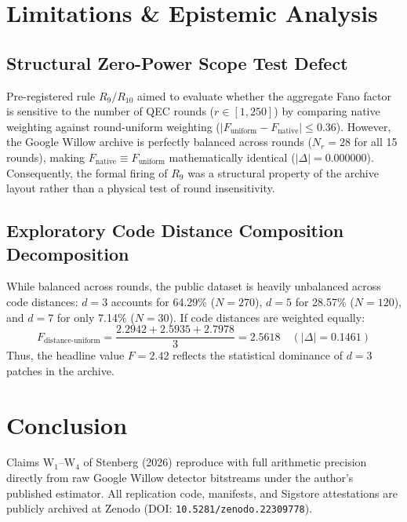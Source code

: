 \documentclass[10pt,a4paper,onecolumn]{article}
\begin{document}
\section{Limitations \& Epistemic Analysis}

\subsection{Structural Zero-Power Scope Test Defect}
Pre-registered rule $R_9/R_{10}$ aimed to evaluate whether the aggregate Fano factor is sensitive to the number of QEC rounds ($r \in [1, 250]$) by comparing native weighting against round-uniform weighting ($|F_{\text{uniform}} - F_{\text{native}}| \le 0.36$). However, the Google Willow archive is perfectly balanced across rounds ($N_r = 28$ for all 15 rounds), making $F_{\text{native}} \equiv F_{\text{uniform}}$ mathematically identical ($|\Delta| = 0.000000$). Consequently, the formal firing of $R_9$ was a structural property of the archive layout rather than a physical test of round insensitivity.

\subsection{Exploratory Code Distance Composition Decomposition}
While balanced across rounds, the public dataset is heavily unbalanced across code distances: $d=3$ accounts for 64.29\% ($N=270$), $d=5$ for 28.57\% ($N=120$), and $d=7$ for only 7.14\% ($N=30$). If code distances are weighted equally:
\begin{equation}
F_{\text{distance-uniform}} = \frac{2.2942 + 2.5935 + 2.7978}{3} = \mathbf{2.5618} \quad (|\Delta| = 0.1461)
\end{equation}
Thus, the headline value $F=2.42$ reflects the statistical dominance of $d=3$ patches in the archive.

\section{Conclusion}
Claims $\text{W}_1$--$\text{W}_4$ of Stenberg (2026) reproduce with full arithmetic precision directly from raw Google Willow detector bitstreams under the author's published estimator. All replication code, manifests, and Sigstore attestations are publicly archived at Zenodo (DOI: \texttt{10.5281/zenodo.22309778}).



\end{document}
